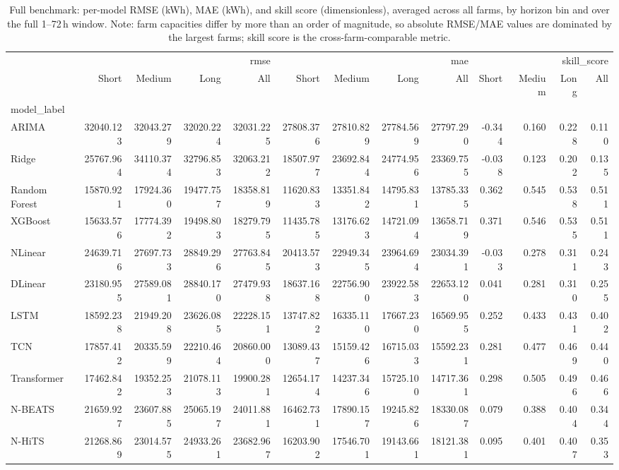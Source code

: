 \begin{table}[ht]
\caption{Full benchmark: per-model RMSE (kWh), MAE (kWh), and skill score (dimensionless), averaged across all farms, by horizon bin and over the full 1--72\,h window. Note: farm capacities differ by more than an order of magnitude, so absolute RMSE/MAE values are dominated by the largest farms; skill score is the cross-farm-comparable metric.}
\label{tab:app_benchmark_full}
\begin{tabular}{lrrrrrrrrrrrr}
\toprule
 & \multicolumn{4}{r}{rmse} & \multicolumn{4}{r}{mae} & \multicolumn{4}{r}{skill_score} \\
 & Short & Medium & Long & All & Short & Medium & Long & All & Short & Medium & Long & All \\
model_label &  &  &  &  &  &  &  &  &  &  &  &  \\
\midrule
ARIMA & 32040.123 & 32043.279 & 32020.224 & 32031.225 & 27808.376 & 27810.829 & 27784.569 & 27797.290 & -0.344 & 0.160 & 0.228 & 0.110 \\
Ridge & 25767.964 & 34110.374 & 32796.853 & 32063.212 & 18507.977 & 23692.844 & 24774.956 & 23369.755 & -0.038 & 0.123 & 0.202 & 0.135 \\
Random Forest & 15870.921 & 17924.360 & 19477.757 & 18358.819 & 11620.833 & 13351.842 & 14795.831 & 13785.335 & 0.362 & 0.545 & 0.538 & 0.511 \\
XGBoost & 15633.576 & 17774.392 & 19498.803 & 18279.795 & 11435.785 & 13176.623 & 14721.094 & 13658.719 & 0.371 & 0.546 & 0.535 & 0.511 \\
NLinear & 24639.716 & 27697.733 & 28849.296 & 27763.845 & 20413.573 & 22949.345 & 23964.694 & 23034.391 & -0.033 & 0.278 & 0.311 & 0.243 \\
DLinear & 23180.955 & 27589.081 & 28840.170 & 27479.938 & 18637.168 & 22756.900 & 23922.583 & 22653.120 & 0.041 & 0.281 & 0.310 & 0.255 \\
LSTM & 18592.238 & 21949.208 & 23626.085 & 22228.151 & 13747.822 & 16335.110 & 17667.230 & 16569.955 & 0.252 & 0.433 & 0.431 & 0.402 \\
TCN & 17857.412 & 20335.599 & 22210.464 & 20860.000 & 13089.437 & 15159.426 & 16715.033 & 15592.231 & 0.281 & 0.477 & 0.469 & 0.440 \\
Transformer & 17462.842 & 19352.253 & 21078.113 & 19900.281 & 12654.174 & 14237.346 & 15725.100 & 14717.361 & 0.298 & 0.505 & 0.496 & 0.466 \\
N-BEATS & 21659.927 & 23607.885 & 25065.197 & 24011.881 & 16462.731 & 17890.157 & 19245.826 & 18330.087 & 0.079 & 0.388 & 0.404 & 0.344 \\
N-HiTS & 21268.869 & 23014.575 & 24933.261 & 23682.967 & 16203.902 & 17546.701 & 19143.661 & 18121.381 & 0.095 & 0.401 & 0.407 & 0.353 \\
\bottomrule
\end{tabular}
\end{table}
